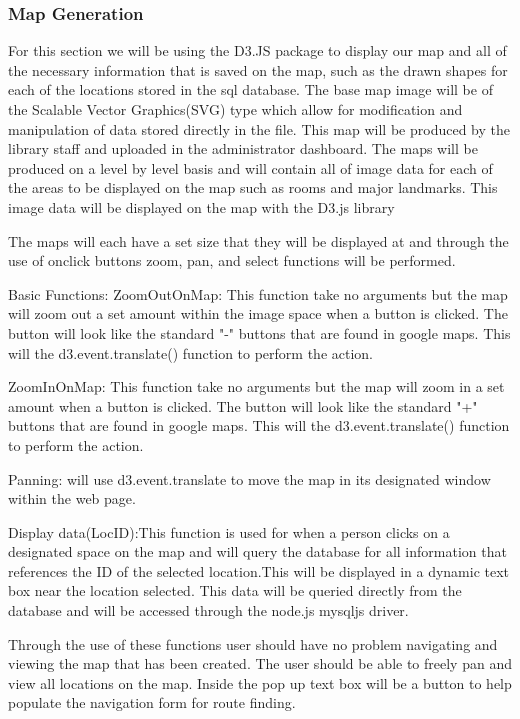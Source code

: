 \documentclass[letterpaper,10pt,titlepage, onecolumn, compsoc]{IEEEtran}
\begin{document}
\subsubsection{Map Generation}
For this section we will be using the D3.JS package to display our map and all of the necessary information that is saved on the map, such as the drawn shapes for each of the locations stored in the sql database. The base map image will be of the Scalable Vector Graphics(SVG) type which allow for modification and manipulation of data stored directly in the file. This map will be produced by the library staff and uploaded in the administrator dashboard. The maps will be produced on a level by level basis and will contain all of image data for each of the areas to be displayed on the map such as rooms and major landmarks. This image data will be displayed on the map with the D3.js library

The maps will each have a set size  that they will be displayed at and  through the use of onclick buttons zoom, pan, and select functions will be performed.

Basic Functions:
ZoomOutOnMap: This function take no arguments but the map will zoom out a set amount within the image space when a button is clicked. The button will look like the standard "-" buttons that are found in google maps. This will the d3.event.translate() function to perform the action.

ZoomInOnMap: This function take no arguments but the map will zoom in a set amount when a button is clicked. The button will look like the standard "+" buttons that are found in google maps. This will the d3.event.translate() function to perform the action.

Panning: will use d3.event.translate to move the map in its designated window within the web page. 

Display data(LocID):This function is used for when a person clicks on a designated space on the map and will query the database for all information that references the ID of the selected location.This will be displayed in a dynamic text box near the location selected. This data will be queried directly from the database and will be accessed through the node.js mysqljs driver.

Through the use of these functions user should have no problem navigating and viewing the map that has been created. The user should be able to freely pan and view all locations on the map. Inside the pop up text box will be a button to help populate the navigation form for route finding.
\end{document}
